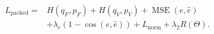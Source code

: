 \begin{equation}
\begin{split}L_{\mathrm{packed}}={}&H(q_F,p_F)+H(q_V,p_V)+\operatorname{MSE}(e,\hat e)\\&+\lambda_c(1-\cos(e,\hat e))+L_{\mathrm{norm}}+\lambda_2R(\Theta).\end{split}\tag{5}\label{eq:original-5}
\end{equation}
